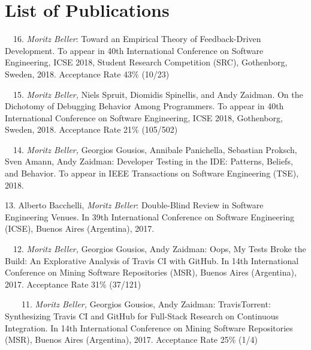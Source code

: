 \chapter*{List of Publications}
\label{publications}

\begin{etaremune}{\small
\item[\faFileTextO~~16.] \emph{Moritz Beller}: Toward an Empirical Theory of
  Feedback-Driven Development. To appear in 40th International Conference on
  Software Engineering, ICSE 2018, Student Research Competition (SRC),
  Gothenborg, Sweden, 2018. Acceptance Rate 43\% (10/23)

\item[\faFileTextO~~15.] \emph{Moritz Beller,} Niels Spruit, Diomidis Spinellis, and Andy
  Zaidman. On the Dichotomy of Debugging Behavior Among Programmers. To appear in 40th
  International Conference on Software Engineering, ICSE 2018, Gothenborg, Sweden, 2018. Acceptance
  Rate 21\% (105/502)

\item[\faFileTextO~~14.] \emph{Moritz Beller,} Georgios Gousios, Annibale Panichella, Sebastian
  Proksch, Sven Amann, Andy Zaidman: Developer Testing in the IDE: Patterns, Beliefs, and
  Behavior. To appear in IEEE Transactions on Software Engineering (TSE), 2018.

\item[13.] Alberto Bacchelli, \emph{Moritz Beller}: Double-Blind Review in Software Engineering
  Venues. In 39th International Conference on Software Engineering (ICSE), Buenos Aires
  (Argentina), 2017.

\item[\faFileTextO~~12.] \emph{Moritz Beller,} Georgios Gousios, Andy Zaidman: Oops, My Tests
  Broke the Build: An Explorative Analysis of Travis CI with GitHub. In 14th International
  Conference on Mining Software Repositories (MSR), Buenos Aires (Argentina), 2017.  Acceptance
  Rate 31\% (37/121)

\item[\faTrophy~~\faFileTextO~~11.] \emph{Moritz Beller,} Georgios Gousios, Andy Zaidman:
  TravisTorrent: Synthesizing Travis CI and GitHub for Full-Stack Research on Continuous
  Integration. In 14th International Conference on Mining Software Repositories (MSR), Buenos Aires
  (Argentina), 2017.  Acceptance Rate 25\% (1/4)

}
\end{etaremune}
